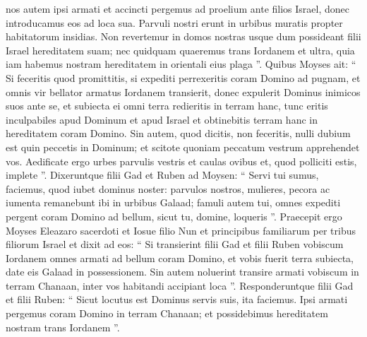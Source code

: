 \begin{biblechapter}
\begin{biblechapter}
\begin{biblechapter}
\begin{biblechapter}
\begin{biblechapter}
\begin{biblechapter}
\begin{biblechapter}
\begin{biblechapter}
\begin{biblechapter}
\begin{biblechapter}
\begin{biblechapter}
\begin{biblechapter}
\begin{biblechapter}
\begin{biblechapter}
\begin{biblechapter}
\begin{biblechapter}
\begin{biblechapter}
\begin{biblechapter}
\begin{biblechapter}
\begin{biblechapter}
\begin{biblechapter}
\begin{biblechapter}
\begin{biblechapter}
\begin{biblechapter}
\begin{biblechapter}
\begin{biblechapter}
\begin{biblechapter}
\begin{biblechapter}
\begin{biblechapter}
\begin{biblechapter}
\begin{biblechapter}
\begin{biblechapter}
\verse nos autem ipsi armati et accincti pergemus ad proelium ante filios Israel, donec introducamus eos ad loca sua. Parvuli nostri erunt in urbibus muratis propter habitatorum insidias. 
\verse Non revertemur in domos nostras usque dum possideant filii Israel hereditatem suam; 
\verse nec quidquam quaeremus trans Iordanem et ultra, quia iam habemus nostram hereditatem in orientali eius plaga ”.
 \verse Quibus Moyses ait: “ Si feceritis quod promittitis, si expediti perrexeritis coram Domino ad pugnam, 
\verse et omnis vir bellator armatus Iordanem transierit, donec expulerit Dominus inimicos suos ante se, 
\verse et subiecta ei omni terra redieritis in terram hanc, tunc eritis inculpabiles apud Dominum et apud Israel et obtinebitis terram hanc in hereditatem coram Domino. 
\verse Sin autem, quod dicitis, non feceritis, nulli dubium est quin peccetis in Dominum; et scitote quoniam peccatum vestrum apprehendet vos. 
\verse Aedificate ergo urbes parvulis vestris et caulas ovibus et, quod polliciti estis, implete ”.
 \verse Dixeruntque filii Gad et Ruben ad Moysen: “ Servi tui sumus, faciemus, quod iubet dominus noster: 
\verse parvulos nostros, mulieres, pecora ac iumenta remanebunt ibi in urbibus Galaad; 
\verse famuli autem tui, omnes expediti pergent coram Domino ad bellum, sicut tu, domine, loqueris ”.
 \verse Praecepit ergo Moyses Eleazaro sacerdoti et Iosue filio Nun et principibus familiarum per tribus filiorum Israel et dixit ad eos: 
\verse “ Si transierint filii Gad et filii Ruben vobiscum Iordanem omnes armati ad bellum coram Domino, et vobis fuerit terra subiecta, date eis Galaad in possessionem. 
\verse Sin autem noluerint transire armati vobiscum in terram Chanaan, inter vos habitandi accipiant loca ”. 
\verse Responderuntque filii Gad et filii Ruben: “ Sicut locutus est Dominus servis suis, ita faciemus. 
\verse Ipsi armati pergemus coram Domino in terram Chanaan; et possidebimus hereditatem nostram trans Iordanem ”.

\end{biblechapter}
\end{biblechapter}
\end{biblechapter}
\end{biblechapter}
\end{biblechapter}
\end{biblechapter}
\end{biblechapter}
\end{biblechapter}
\end{biblechapter}
\end{biblechapter}
\end{biblechapter}
\end{biblechapter}
\end{biblechapter}
\end{biblechapter}
\end{biblechapter}
\end{biblechapter}
\end{biblechapter}
\end{biblechapter}
\end{biblechapter}
\end{biblechapter}
\end{biblechapter}
\end{biblechapter}
\end{biblechapter}
\end{biblechapter}
\end{biblechapter}
\end{biblechapter}
\end{biblechapter}
\end{biblechapter}
\end{biblechapter}
\end{biblechapter}
\end{biblechapter}
\end{biblechapter}

